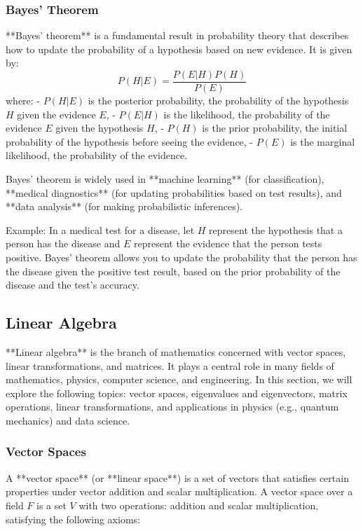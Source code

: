 \documentclass{article}
\begin{document}
\subsubsection*{Bayes' Theorem}

**Bayes' theorem** is a fundamental result in probability theory that describes how to update the probability of a hypothesis based on new evidence. It is given by:
\[
P(H | E) = \frac{P(E | H) P(H)}{P(E)}
\]
where:
- \( P(H | E) \) is the posterior probability, the probability of the hypothesis \( H \) given the evidence \( E \),
- \( P(E | H) \) is the likelihood, the probability of the evidence \( E \) given the hypothesis \( H \),
- \( P(H) \) is the prior probability, the initial probability of the hypothesis before seeing the evidence,
- \( P(E) \) is the marginal likelihood, the probability of the evidence.

Bayes' theorem is widely used in **machine learning** (for classification), **medical diagnostics** (for updating probabilities based on test results), and **data analysis** (for making probabilistic inferences).

Example: In a medical test for a disease, let \( H \) represent the hypothesis that a person has the disease and \( E \) represent the evidence that the person tests positive. Bayes' theorem allows you to update the probability that the person has the disease given the positive test result, based on the prior probability of the disease and the test's accuracy.


\subsection{Linear Algebra}

**Linear algebra** is the branch of mathematics concerned with vector spaces, linear transformations, and matrices. It plays a central role in many fields of mathematics, physics, computer science, and engineering. In this section, we will explore the following topics: vector spaces, eigenvalues and eigenvectors, matrix operations, linear transformations, and applications in physics (e.g., quantum mechanics) and data science.

\subsubsection*{Vector Spaces}

A **vector space** (or **linear space**) is a set of vectors that satisfies certain properties under vector addition and scalar multiplication. A vector space over a field \( F \) is a set \( V \) with two operations: addition and scalar multiplication, satisfying the following axioms:
\end{document}
